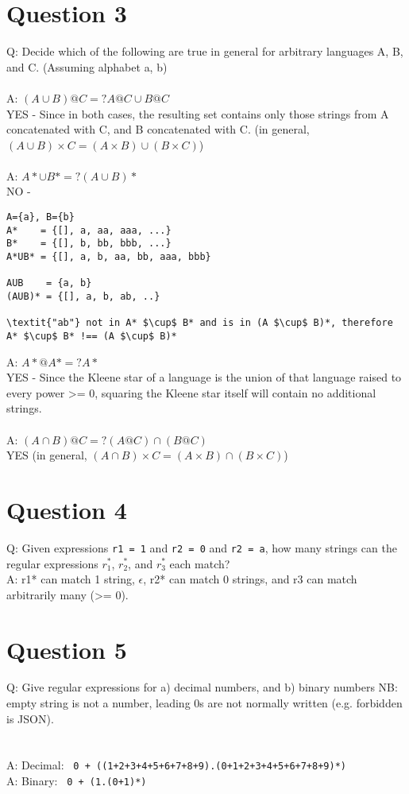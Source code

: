 \documentclass[english]{scrartcl}
\begin{document}
\section*{Question 3}
Q: Decide which of the following are true in general for arbitrary languages A, B, and C. (Assuming alphabet {a, b})
\\ \\
A: $(A \cup B)@C =? A@C \cup B@C$ \\
YES - Since in both cases, the resulting set contains only those strings from A concatenated with C, and B concatenated with C. (in general, $(A \cup B) \times C = (A \times B) \cup (B \times C)$)
\\ \\
A: $A* \cup B* =? (A \cup B)*$ \\
NO -
\begin{Verbatim}[mathescape,commandchars=\\\{\}]
A={a}, B={b}
A*    = {[], a, aa, aaa, ...}
B*    = {[], b, bb, bbb, ...}
A*UB* = {[], a, b, aa, bb, aaa, bbb}

AUB    = {a, b}
(AUB)* = {[], a, b, ab, ..}

\textit{"ab"} not in A* $\cup$ B* and is in (A $\cup$ B)*, therefore A* $\cup$ B* !== (A $\cup$ B)*
\end{Verbatim}

A: $A*@A* =? A*$ \\
YES - Since the Kleene star of a language is the union of that language raised to every power >= 0, squaring the Kleene star itself will contain no additional strings.
\\ \\
A: $(A \cap B)@C =? (A@C)\cap(B@C)$ \\
YES (in general, $(A \cap B) \times C = (A \times B) \cap (B \times C)$)

\section*{Question 4}
Q: Given expressions \verb|r1 = 1| and \verb|r2 = 0| and \verb|r2 = a|,
how many strings can the regular expressions $r_1^*$, $r_2^*$, and $r_3^*$ each match?
\\
A: r1* can match 1 string, $\epsilon$, r2* can match 0 strings, and r3 can match arbitrarily many (>= 0).

\section*{Question 5}
Q: Give regular expressions for a) decimal numbers, and b) binary numbers
NB: empty string is not a number, leading 0s are not normally written (e.g. forbidden is JSON).\\
\\
 \\
A: Decimal: \verb~ 0 + ((1+2+3+4+5+6+7+8+9).(0+1+2+3+4+5+6+7+8+9)*) ~ \\
A: Binary: \verb~ 0 + (1.(0+1)*) ~
\end{document}
